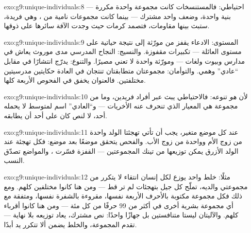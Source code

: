 \begin{solution}{exo:g9:unique-individuals:8}
احتياطي: فالمستنسخات كانت مجموعة واحدة مكررة --- بنية
واحدة، وضعف واحد مشترك --- بينما كانت مجموعات 
نامية من ، وهي فريدة، ستبث بينها مقاومات، فتصمد
كرمات حيث وجدت الآفة سائرها على ذوقها.
\end{solution}

\begin{solution}{exo:g9:unique-individuals:9}
المستوى: الادعاء يقفز من مورّثة إلى نتيجة حياتية على
مستوى العائلة --- تكبيرات مقفوزة. والنسيج: النجاح
المدرسي مدى موروث يعاش في مدارس وبيوت ولغات --- ومورّثة
واحدة لا تعني مصيرًا. والتنوع: يدرّج انتشارًا في مقابل
``عادي'' وهمي. والتوأمان: مجموعتان متطابقتان تنتجان في
العادة حكايتين مدرسيتين مختلفتين. فالعنوان يخفق في
الفحوص الأربعة كلها.
\end{solution}

\begin{solution}{exo:g9:unique-individuals:10}
لأن  \emph{هو} تنوعه: فالاحتياطي يبث  عبر
أفراد فريدين، وما من مجموعة هي المعيار الذي تنحرف عنه
الأخريات --- و``العادي'' اسم لمتوسط لا يحمله أحد، لا لنص
كان على أحد أن يطابقه.
\end{solution}

\begin{solution}{exo:g9:unique-individuals:11}
عند كل موضع متغير، يجب أن تأتي تهجئتا الولد واحدة من زوج
الأم وواحدة من زوج الأب. والفحص يتحقق موضعًا بعد موضع:
فكل تهجئة عند الولد الأزرق  يمكن توزيعها من تينك
المجموعتين --- القفزة فسّرت ، والمواضع تصدّق
النسب.
\end{solution}

\begin{solution}{exo:g9:unique-individuals:12}
مثلًا: خلط واحد يوزع لكل إنسان انتقاء لا يتكرر من
مجموعتي والديه،  تملّح كل جيل بتهجئات لم تر قط ---
ومن هنا كانوا مختلفين كلهم. ومع ذلك فكل مجموعة مكتوبة
بالأحرف الأربعة نفسها، مقروءة بالشفرة نفسها، ومتفقة مع
أي مجموعة بشرية أخرى في أكثر من $99$ حرفًا من كل مئة ---
ومن هنا كانوا أقرباء كلهم. والآليتان ليستا متنافستين بل
جهازًا واحدًا: نص مشترك، يعاد توزيعه بلا نهاية ---
 تقدم المجموعة، والخلط يضمن ألا تتكرر يد أبدًا.
\end{solution}

